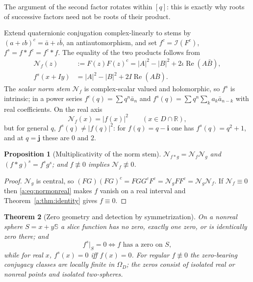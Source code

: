 \documentclass[11pt,a4paper]{article}
\numberwithin{equation}{section}
\newtheorem{theorem}{Theorem}[section]
\newtheorem{proposition}[theorem]{Proposition}
\theoremstyle{definition}
\theoremstyle{remark}
\theoremstyle{plain}
\newcommand{\RR}{\mathbb R}
\newcommand{\SSS}{\mathbb S}
\DeclareMathOperator{\Rea}{Re}
\newcommand{\I}{\mathcal I}
\newcommand{\Om}{\Omega}
\newcommand{\abs}[1]{\lvert #1\rvert}
\begin{document}
The argument of the second factor rotates within $[q]$: this is exactly why
roots of successive factors need not be roots of their product.

Extend quaternionic conjugation complex-linearly to stems by
$(a+\iota b)^c=\bar a+\iota\bar b$, an antiautomorphism, and set
$f^c=\I(F^c)$, $f^s=f*f^c=f^c*f$. The equality of the two products follows
from
\begin{align}
 \mathcal N_f(z)&:=F(z)F(z)^c=\abs A^2-\abs B^2+2\iota\Rea(A\bar B),
 \label{a:eq:normstem}\\
 f^s(x+Iy)&=\abs A^2-\abs B^2+2I\Rea(A\bar B).
 \label{a:eq:symmetrization}
\end{align}
The \emph{scalar norm stem} $\mathcal N_f$ is complex-scalar valued and
holomorphic, so $f^s$ is intrinsic; in a power series $f^c(q)=\sum q^n\bar a_n$
and $f^s(q)=\sum q^n\sum_k a_k\bar a_{n-k}$ with real coefficients. On the
real axis
\begin{equation}
 \mathcal N_f(x)=\abs{f(x)}^2\qquad(x\in D\cap\RR),
 \label{a:eq:normonreal}
\end{equation}
but for general $q$, $f^s(q)\ne\abs{f(q)}^2$: for $f(q)=q-\mathbf i$ one has
$f^s(q)=q^2+1$, and at $q=\mathbf j$ these are $0$ and $2$.

\begin{proposition}[Multiplicativity of the norm stem]
\label{a:prop:norm-multiplicative}
$\mathcal N_{f*g}=\mathcal N_f\mathcal N_g$ and $(f*g)^s=f^sg^s$; and
$f\not\equiv0$ implies $\mathcal N_f\not\equiv0$.
\end{proposition}

\begin{proof}
$\mathcal N_g$ is central, so
$(FG)(FG)^c=FGG^cF^c=\mathcal N_gFF^c=\mathcal N_g\mathcal N_f$. If
$\mathcal N_f\equiv0$ then \eqref{a:eq:normonreal} makes $f$ vanish on a real
interval and Theorem~\ref{a:thm:identity} gives $f\equiv0$.
\end{proof}

\begin{theorem}[Zero geometry and detection by symmetrization]
\label{a:thm:zeros}
On a nonreal sphere $S=x+y\SSS$ a slice function has no zero, exactly one
zero, or is identically zero there; and
\begin{equation}
 f^s\big|_S=0\iff f\text{ has a zero on }S,
 \label{a:eq:zero-detection}
\end{equation}
while for real $x$, $f^s(x)=0$ iff $f(x)=0$. For regular $f\not\equiv0$ the
zero-bearing conjugacy classes are locally finite in $\Om_D$; the zeros
consist of isolated real or nonreal points and isolated two-spheres.
\end{theorem}
\end{document}
